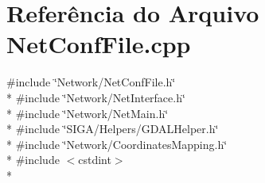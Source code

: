 \section{Referência do Arquivo Net\+Conf\+File.\+cpp}
\label{_net_conf_file_8cpp}
{\ttfamily \#include \char`\"{}Network/\+Net\+Conf\+File.\+h\char`\"{}}\\*
{\ttfamily \#include \char`\"{}Network/\+Net\+Interface.\+h\char`\"{}}\\*
{\ttfamily \#include \char`\"{}Network/\+Net\+Main.\+h\char`\"{}}\\*
{\ttfamily \#include \char`\"{}S\+I\+G\+A/\+Helpers/\+G\+D\+A\+L\+Helper.\+h\char`\"{}}\\*
{\ttfamily \#include \char`\"{}Network/\+Coordinates\+Mapping.\+h\char`\"{}}\\*
{\ttfamily \#include $<$cstdint$>$}\\*
